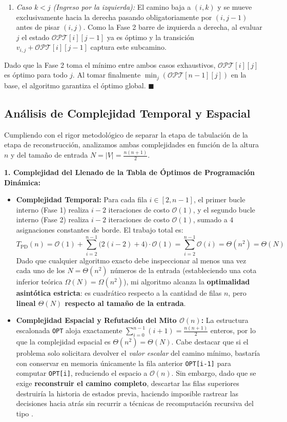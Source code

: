 \begin{itemize}
\begin{enumerate}
        \item \textit{Caso $k < j$ (Ingreso por la izquierda):} El camino baja a $(i, k)$ y se mueve exclusivamente hacia la derecha pasando obligatoriamente por $(i, j-1)$ antes de pisar $(i, j)$. Como la Fase 2 barre de izquierda a derecha, al evaluar $j$ el estado $\mathcal{OPT}[i][j-1]$ ya es óptimo y la transición $v_{i,j} + \mathcal{OPT}[i][j-1]$ captura este subcamino.
    \end{enumerate}
    Dado que la Fase 2 toma el mínimo entre ambos casos exhaustivos, $\mathcal{OPT}[i][j]$ es óptimo para todo $j$. Al tomar finalmente $\min_{j}(\mathcal{OPT}[n-1][j])$ en la base, el algoritmo garantiza el óptimo global. $\blacksquare$
\end{itemize}

\subsection{Análisis de Complejidad Temporal y Espacial}

Cumpliendo con el rigor metodológico de separar la etapa de tabulación de la etapa de reconstrucción, analizamos ambas complejidades en función de la altura $n$ y del tamaño de entrada $N = |V| = \frac{n(n+1)}{2}$.

\textbf{1. Complejidad del Llenado de la Tabla de Óptimos de Programación Dinámica:}
\begin{itemize}
    \item \textbf{Complejidad Temporal:} Para cada fila $i \in [2, n-1]$, el primer bucle interno (Fase 1) realiza $i - 2$ iteraciones de costo $\mathcal{O}(1)$, y el segundo bucle interno (Fase 2) realiza $i - 2$ iteraciones de costo $\mathcal{O}(1)$, sumado a $4$ asignaciones constantes de borde. El trabajo total es:
    \[
        T_{\text{PD}}(n) = \mathcal{O}(1) + \sum_{i=2}^{n-1} \big(2(i - 2) + 4\big) \cdot \mathcal{O}(1) = \sum_{i=2}^{n-1} \mathcal{O}(i) = \Theta(n^2) = \Theta(N)
    \]
    Dado que cualquier algoritmo exacto debe inspeccionar al menos una vez cada uno de los $N = \Theta(n^2)$ números de la entrada (estableciendo una cota inferior teórica $\Omega(N) = \Omega(n^2)$), mi algoritmo alcanza la \textbf{optimalidad asintótica estricta}: es cuadrático respecto a la cantidad de filas $n$, pero \textbf{lineal $\Theta(N)$ respecto al tamaño de la entrada}.
    \item \textbf{Complejidad Espacial y Refutación del Mito $\mathcal{O}(n)$:} La estructura escalonada \verb|OPT| aloja exactamente $\sum_{i=0}^{n-1} (i+1) = \frac{n(n+1)}{2}$ enteros, por lo que la complejidad espacial es $\Theta(n^2) = \Theta(N)$. Cabe destacar que si el problema solo solicitara devolver el \textit{valor escalar} del camino mínimo, bastaría con conservar en memoria únicamente la fila anterior \verb|OPT[i-1]| para computar \verb|OPT[i]|, reduciendo el espacio a $\mathcal{O}(n)$. Sin embargo, dado que se exige \textbf{reconstruir el camino completo}, descartar las filas superiores destruiría la historia de estados previa, haciendo imposible rastrear las decisiones hacia atrás sin recurrir a técnicas de recomputación recursiva del tipo \textcite{hirschberg1975}.
\end{itemize}

